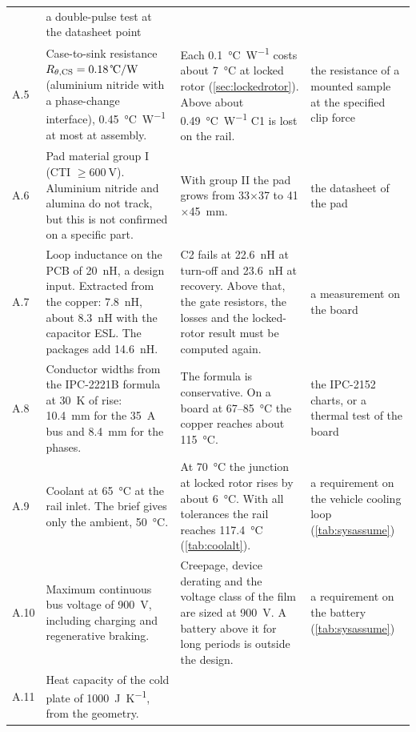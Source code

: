 {\begin{longtable}{L{0.05\textwidth}L{0.36\textwidth}L{0.30\textwidth}L{0.20\textwidth}}
    & a double-pulse test at the datasheet point \\
A.5 & Case-to-sink resistance $\Rthcs = \SI{0.18}{\celsius\per\watt}$ (aluminium nitride with a phase-change interface), \SI{0.45}{\celsius\per\watt} at most at assembly.
    & Each \SI{0.1}{\celsius\per\watt} costs about \SI{7}{\celsius} at locked rotor (\cref{sec:lockedrotor}). Above about \SI{0.49}{\celsius\per\watt} C1 is lost on the rail.
    & the resistance of a mounted sample at the specified clip force \\
A.6 & Pad material group I (CTI $\geq \SI{600}{\volt}$). Aluminium nitride and alumina do not track, but this is not confirmed on a specific part.
    & With group II the pad grows from \SI{33}{}$\times$\SI{37}{} to \SI{41}{}$\times$\SI{45}{\milli\metre}.
    & the datasheet of the pad \\
A.7 & Loop inductance on the PCB of \SI{20}{\nano\henry}, a design input. Extracted from the copper: \SI{7.8}{\nano\henry}, about \SI{8.3}{\nano\henry} with the capacitor ESL. The packages add \SI{14.6}{\nano\henry}.
    & C2 fails at \SI{22.6}{\nano\henry} at turn-off and \SI{23.6}{\nano\henry} at recovery. Above that, the gate resistors, the losses and the locked-rotor result must be computed again.
    & a measurement on the board \\
A.8 & Conductor widths from the IPC-2221B formula at \SI{30}{\kelvin} of rise: \SI{10.4}{\milli\metre} for the \SI{35}{\ampere} bus and \SI{8.4}{\milli\metre} for the phases.
    & The formula is conservative. On a board at \SI{67}{}--\SI{85}{\celsius} the copper reaches about \SI{115}{\celsius}.
    & the IPC-2152 charts, or a thermal test of the board \\
A.9 & Coolant at \SI{65}{\celsius} at the rail inlet. The brief gives only the ambient, \SI{50}{\celsius}.
    & At \SI{70}{\celsius} the junction at locked rotor rises by about \SI{6}{\celsius}. With all tolerances the rail reaches \SI{117.4}{\celsius} (\cref{tab:coolalt}).
    & a requirement on the vehicle cooling loop (\cref{tab:sysassume}) \\
A.10 & Maximum continuous bus voltage of \SI{900}{\volt}, including charging and regenerative braking.
    & Creepage, device derating and the voltage class of the film are sized at \SI{900}{\volt}. A battery above it for long periods is outside the design.
    & a requirement on the battery (\cref{tab:sysassume}) \\
A.11 & Heat capacity of the cold plate of \SI{1000}{\joule\per\kelvin}, from the geometry.

\end{longtable}}
